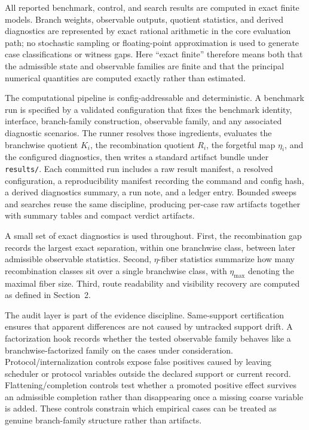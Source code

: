 \documentclass[11pt]{article}
\theoremstyle{definition}
\begin{document}
All reported benchmark, control, and search results are computed in exact finite models. Branch weights, observable outputs, quotient statistics, and derived diagnostics are represented by exact rational arithmetic in the core evaluation path; no stochastic sampling or floating-point approximation is used to generate case classifications or witness gaps. Here ``exact finite'' therefore means both that the admissible state and observable families are finite and that the principal numerical quantities are computed exactly rather than estimated.

The computational pipeline is config-addressable and deterministic. A benchmark run is specified by a validated configuration that fixes the benchmark identity, interface, branch-family construction, observable family, and any associated diagnostic scenarios. The runner resolves those ingredients, evaluates the branchwise quotient \(K_i\), the recombination quotient \(R_i\), the forgetful map \(\eta_i\), and the configured diagnostics, then writes a standard artifact bundle under \texttt{results/}. Each committed run includes a raw result manifest, a resolved configuration, a reproducibility manifest recording the command and config hash, a derived diagnostics summary, a run note, and a ledger entry. Bounded sweeps and searches reuse the same discipline, producing per-case raw artifacts together with summary tables and compact verdict artifacts.

A small set of exact diagnostics is used throughout. First, the recombination gap records the largest exact separation, within one branchwise class, between later admissible observable statistics. Second, \(\eta\)-fiber statistics summarize how many recombination classes sit over a single branchwise class, with \(\eta_{\max}\) denoting the maximal fiber size. Third, route readability and visibility recovery are computed as defined in Section~2.

The audit layer is part of the evidence discipline. Same-support certification ensures that apparent differences are not caused by untracked support drift. A factorization hook records whether the tested observable family behaves like a branchwise-factorized family on the cases under consideration. Protocol/internalization controls expose false positives caused by leaving scheduler or protocol variables outside the declared support or current record. Flattening/completion controls test whether a promoted positive effect survives an admissible completion rather than disappearing once a missing coarse variable is added. These controls constrain which empirical cases can be treated as genuine branch-family structure rather than artifacts.
\end{document}
